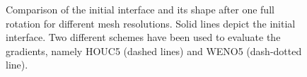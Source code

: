 \begin{figure}[t!]
\centering
  \caption{Comparison of the initial interface and its shape after one full rotation for different mesh resolutions. Solid lines depict the initial interface. Two different schemes have been used to evaluate the gradients, namely HOUC5 (dashed lines) and WENO5 (dash-dotted line).}
  \label{fig:zalesak}
\end{figure}

 

